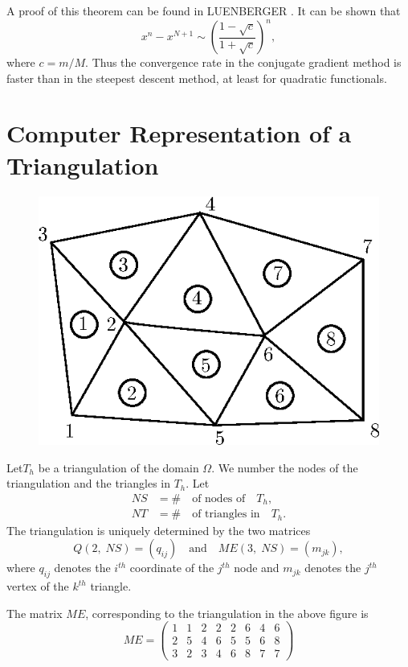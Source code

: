 A proof of this theorem can be found in LUENBERGER \cite{key31}. It can be
shown that 
$$
x^n-x^{N+1}\sim \left(\frac{1-\sqrt{c}}{1+\sqrt{c}}\right)^n,
$$
where $c=m/M$. Thus the convergence rate in the conjugate gradient
method is faster than in the steepest descent method, at least for
quadratic functionals.

\section{Computer Representation of a Triangulation}\label{chap4:ssec4.4} 
\begin{figure}[H]
\centering
\includegraphics{figure/fig4.1.eps}
\caption{}\label{fig4.1}
\end{figure}


Let\pageoriginale $T_h$ be a triangulation of the domain $\Omega$. We
number the nodes of the triangulation and the triangles in $T_h$. Let
\begin{align*}
NS &= \#\quad\text{of nodes of}\quad T_h,\\
NT &= \#\quad\text{of triangles in}\quad T_h.
\end{align*}
The triangulation is uniquely determined by the two matrices
$$
Q(2,\; NS)=(q_{ij})\quad\text{and}\quad ME(3,\; NS)=(m_{jk}),
$$
where $q_{ij}$ denotes the $i^{th}$ coordinate of the $j^{th}$ node
and $m_{jk}$ denotes the $j^{th}$ vertex of the $k^{th}$ triangle.

The matrix $ME$, corresponding to the triangulation in the above
figure is 
\begin{equation*}
ME=
\begin{pmatrix}
1&1&2&2&2&6&4&6\\
2&5&4&6&5&5&6&8\\
3&2&3&4&6&8&7&7
\end{pmatrix}
\end{equation*}

